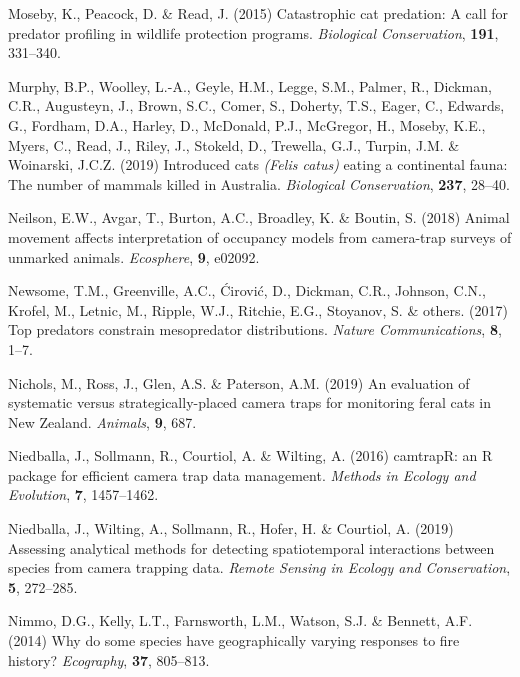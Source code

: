 \documentclass[11pt,a4paper,titlepage,twoside,openright]{style/unimelbthesis}
\begin{document}
\begin{mainmatter}
\leavevmode\hypertarget{ref-moseby2015catastrophic}{}%
Moseby, K., Peacock, D. \& Read, J. (2015) Catastrophic cat predation: A call for predator profiling in wildlife protection programs. \emph{Biological Conservation}, \textbf{191}, 331--340.

\leavevmode\hypertarget{ref-murphy2019introduced}{}%
Murphy, B.P., Woolley, L.-A., Geyle, H.M., Legge, S.M., Palmer, R., Dickman, C.R., Augusteyn, J., Brown, S.C., Comer, S., Doherty, T.S., Eager, C., Edwards, G., Fordham, D.A., Harley, D., McDonald, P.J., McGregor, H., Moseby, K.E., Myers, C., Read, J., Riley, J., Stokeld, D., Trewella, G.J., Turpin, J.M. \& Woinarski, J.C.Z. (2019) Introduced cats \emph{(Felis catus)} eating a continental fauna: The number of mammals killed in Australia. \emph{Biological Conservation}, \textbf{237}, 28--40.

\leavevmode\hypertarget{ref-neilson2018animal}{}%
Neilson, E.W., Avgar, T., Burton, A.C., Broadley, K. \& Boutin, S. (2018) Animal movement affects interpretation of occupancy models from camera-trap surveys of unmarked animals. \emph{Ecosphere}, \textbf{9}, e02092.

\leavevmode\hypertarget{ref-newsome2017top}{}%
Newsome, T.M., Greenville, A.C., Ćirović, D., Dickman, C.R., Johnson, C.N., Krofel, M., Letnic, M., Ripple, W.J., Ritchie, E.G., Stoyanov, S. \& others. (2017) Top predators constrain mesopredator distributions. \emph{Nature Communications}, \textbf{8}, 1--7.

\leavevmode\hypertarget{ref-nichols2019evaluation}{}%
Nichols, M., Ross, J., Glen, A.S. \& Paterson, A.M. (2019) An evaluation of systematic versus strategically-placed camera traps for monitoring feral cats in New Zealand. \emph{Animals}, \textbf{9}, 687.

\leavevmode\hypertarget{ref-niedballa2016}{}%
Niedballa, J., Sollmann, R., Courtiol, A. \& Wilting, A. (2016) camtrapR: an R package for efficient camera trap data management. \emph{Methods in Ecology and Evolution}, \textbf{7}, 1457--1462.

\leavevmode\hypertarget{ref-niedballa2019assessing}{}%
Niedballa, J., Wilting, A., Sollmann, R., Hofer, H. \& Courtiol, A. (2019) Assessing analytical methods for detecting spatiotemporal interactions between species from camera trapping data. \emph{Remote Sensing in Ecology and Conservation}, \textbf{5}, 272--285.

\leavevmode\hypertarget{ref-nimmo2014why}{}%
Nimmo, D.G., Kelly, L.T., Farnsworth, L.M., Watson, S.J. \& Bennett, A.F. (2014) Why do some species have geographically varying responses to fire history? \emph{Ecography}, \textbf{37}, 805--813.


\end{mainmatter}
\end{document}
